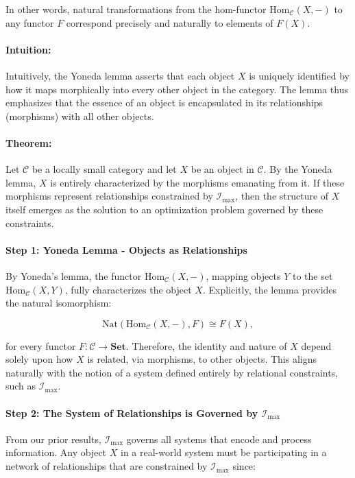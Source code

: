 \documentclass[12pt]{article}
\begin{document}
In other words, natural transformations from the hom-functor \(\mathrm{Hom}_{\mathcal{C}}(X,-)\) to any functor \(F\) correspond precisely and naturally to elements of \(F(X)\).

\paragraph{Intuition:}
Intuitively, the Yoneda lemma asserts that each object \( X \) is uniquely identified by how it maps morphically into every other object in the category. The lemma thus emphasizes that the essence of an object is encapsulated in its relationships (morphisms) with all other objects.

\paragraph{Theorem:}
Let \(\mathcal{C}\) be a locally small category and let \(X\) be an object in \(\mathcal{C}\). By the Yoneda lemma, \(X\) is entirely characterized by the morphisms emanating from it. If these morphisms represent relationships constrained by \(\mathcal{I}_{\max}\), then the structure of \(X\) itself emerges as the solution to an optimization problem governed by these constraints.

\paragraph{Step 1: Yoneda Lemma - Objects as Relationships}
By Yoneda's lemma, the functor \(\mathrm{Hom}_{\mathcal{C}}(X,-)\), mapping objects \(Y\) to the set \(\mathrm{Hom}_{\mathcal{C}}(X,Y)\), fully characterizes the object \(X\). Explicitly, the lemma provides the natural isomorphism:

\begin{equation}
\mathrm{Nat}(\mathrm{Hom}_{\mathcal{C}}(X,-),F) \cong F(X),
\end{equation}

for every functor \(F: \mathcal{C} \to \mathbf{Set}\). Therefore, the identity and nature of \(X\) depend solely upon how \(X\) is related, via morphisms, to other objects. This aligns naturally with the notion of a system defined entirely by relational constraints, such as \(\mathcal{I}_{\max}\).


\paragraph{Step 2: The System of Relationships is Governed by \(\mathcal{I}_{\max}\)}
From our prior results, \(\mathcal{I}_{\max}\) governs all systems that encode and process information. Any object \( X \) in a real-world system must be participating in a network of relationships that are constrained by \(\mathcal{I}_{\max}\) since:
\end{document}
